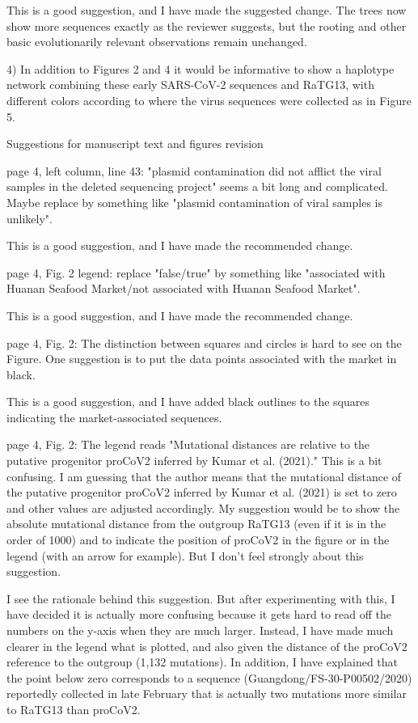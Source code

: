 \documentclass[11pt, oneside]{article}   	%
\newcommand{\response}[1]{{\color{black}#1}}
\begin{document}
\response{This is a good suggestion, and I have made the suggested change. The trees now show more sequences exactly as the reviewer suggests, but the rooting and other basic evolutionarily relevant observations remain unchanged.}

4) In addition to Figures 2 and 4 it would be informative to show a haplotype network combining these early SARS-CoV-2 sequences and RaTG13, with different colors according to where the virus sequences were collected as in Figure 5.


Suggestions for manuscript text and figures revision

page 4, left column, line 43: "plasmid contamination did not afflict the viral samples in the deleted sequencing project" seems a bit long and complicated. Maybe replace by something like "plasmid contamination of viral samples is unlikely".

\response{This is a good suggestion, and I have made the recommended change.}

page 4, Fig. 2 legend: replace "false/true" by something like "associated with Huanan Seafood Market/not associated with Huanan Seafood Market".

\response{This is a good suggestion, and I have made the recommended change.}

page 4, Fig. 2: The distinction between squares and circles is hard to see on the Figure. One suggestion is to put the data points associated with the market in black.

\response{This is a good suggestion, and I have added black outlines to the squares indicating the market-associated sequences.}

page 4, Fig. 2: The legend reads "Mutational distances are relative to the putative progenitor proCoV2 inferred by Kumar et al. (2021)." This is a bit confusing. I am guessing that the author means that the mutational distance of the putative progenitor proCoV2 inferred by Kumar et al. (2021) is set to zero and other values are adjusted accordingly. My suggestion would be to show the absolute mutational distance from the outgroup RaTG13 (even if it is in the order of 1000) and to indicate the position of proCoV2 in the figure or in the legend (with an arrow for example). But I don't feel strongly about this suggestion.

\response{I see the rationale behind this suggestion. But after experimenting with this, I have decided it is actually more confusing because it gets hard to read off the numbers on the y-axis when they are much larger. Instead, I have made much clearer in the legend what is plotted, and also given the distance of the proCoV2 reference to the outgroup (1,132 mutations). In addition, I have explained that the point below zero corresponds to a sequence (Guangdong/FS-30-P00502/2020) reportedly collected in late February that is actually two mutations more similar to RaTG13 than proCoV2.}
\end{document}
